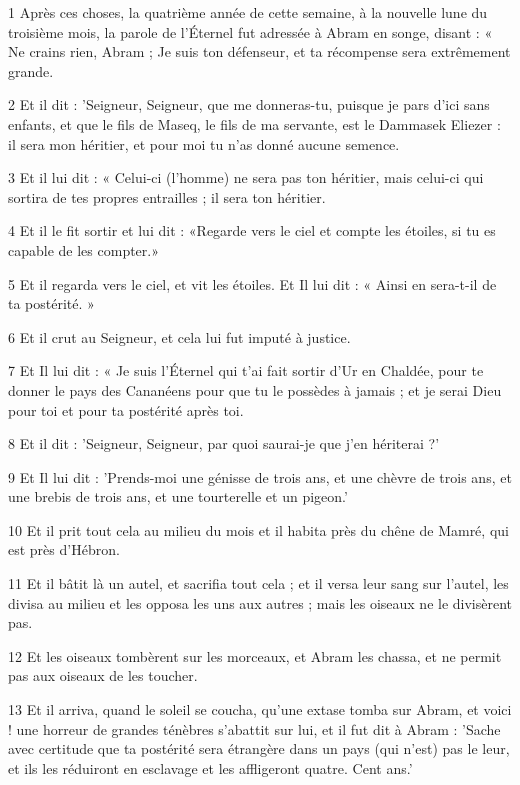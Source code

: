 \par 1 Après ces choses, la quatrième année de cette semaine, à la nouvelle lune du troisième mois, la parole de l'Éternel fut adressée à Abram en songe, disant : « Ne crains rien, Abram ; Je suis ton défenseur, et ta récompense sera extrêmement grande.
\par 2 Et il dit : 'Seigneur, Seigneur, que me donneras-tu, puisque je pars d'ici sans enfants, et que le fils de Maseq, le fils de ma servante, est le Dammasek Eliezer : il sera mon héritier, et pour moi tu n'as donné aucune semence.
\par 3 Et il lui dit : « Celui-ci (l'homme) ne sera pas ton héritier, mais celui-ci qui sortira de tes propres entrailles ; il sera ton héritier.
\par 4 Et il le fit sortir et lui dit : «Regarde vers le ciel et compte les étoiles, si tu es capable de les compter.»
\par 5 Et il regarda vers le ciel, et vit les étoiles. Et Il lui dit : « Ainsi en sera-t-il de ta postérité. »
\par 6 Et il crut au Seigneur, et cela lui fut imputé à justice.
\par 7 Et Il lui dit : « Je suis l'Éternel qui t'ai fait sortir d'Ur en Chaldée, pour te donner le pays des Cananéens pour que tu le possèdes à jamais ; et je serai Dieu pour toi et pour ta postérité après toi.
\par 8 Et il dit : 'Seigneur, Seigneur, par quoi saurai-je que j'en hériterai ?'
\par 9 Et Il lui dit : 'Prends-moi une génisse de trois ans, et une chèvre de trois ans, et une brebis de trois ans, et une tourterelle et un pigeon.'
\par 10 Et il prit tout cela au milieu du mois et il habita près du chêne de Mamré, qui est près d'Hébron.
\par 11 Et il bâtit là un autel, et sacrifia tout cela ; et il versa leur sang sur l'autel, les divisa au milieu et les opposa les uns aux autres ; mais les oiseaux ne le divisèrent pas.
\par 12 Et les oiseaux tombèrent sur les morceaux, et Abram les chassa, et ne permit pas aux oiseaux de les toucher.
\par 13 Et il arriva, quand le soleil se coucha, qu'une extase tomba sur Abram, et voici ! une horreur de grandes ténèbres s'abattit sur lui, et il fut dit à Abram : 'Sache avec certitude que ta postérité sera étrangère dans un pays (qui n'est) pas le leur, et ils les réduiront en esclavage et les affligeront quatre. Cent ans.'
